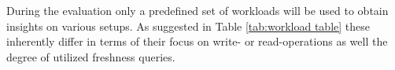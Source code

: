 








During the evaluation only a predefined set of workloads will be used to obtain insights on various setups.
As suggested in Table \ref{tab:workload table} these inherently differ in terms of their focus on write- or read-operations as well the
degree of utilized freshness queries.\\


